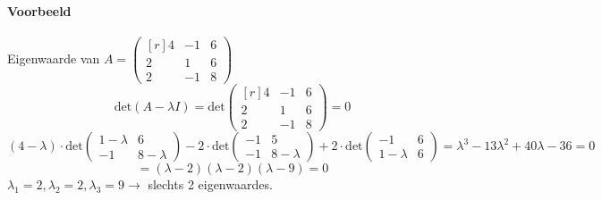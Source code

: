 \paragraph{Voorbeeld} Eigenwaarde van $A = \begin{pmatrix*}[r]
	4 & -1 & 6 \\
	2 & 1 & 6 \\
	2 & -1 & 8
\end{pmatrix*}$
\[ \mbox{det}(A - \lambda I) = \mbox{det}\begin{pmatrix*}[r]
	4 & -1 & 6 \\
	2 & 1 & 6 \\
	2 & -1 & 8
\end{pmatrix*} = 0 \]
\[ (4 - \lambda) \cdot \mbox{det} \begin{pmatrix}
	1 - \lambda & 6 \\
	-1 & 8 - \lambda
\end{pmatrix} - 2 \cdot \mbox{det} \begin{pmatrix}
	-1 & 5 \\
	-1 & 8 - \lambda
\end{pmatrix} + 2 \cdot \mbox{det} \begin{pmatrix}
	-1 & 6 \\
	1 - \lambda & 6
\end{pmatrix} = \lambda^3 - 13 \lambda^2 + 40 \lambda - 36 = 0 \]
\[ = (\lambda -2) (\lambda-2) (\lambda-9) = 0 \]
$\lambda_1 = 2, \lambda_2 = 2, \lambda_3 = 9 \to$ slechts 2 eigenwaardes.

